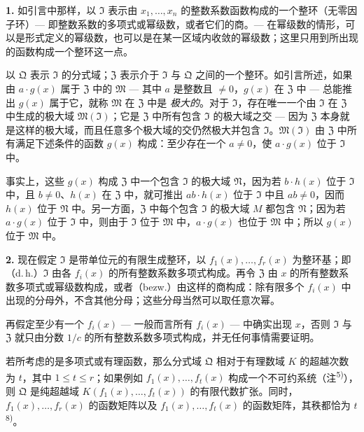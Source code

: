 \documentclass[11pt]{article}
\begin{document}
\noindent\textbf{1.}
如引言中那样，以 $\mathfrak{I}$ 表示由 $x_1,\ldots,x_n$ 的整数系数函数构成的一个整环（无零因子环）--- 即整数系数的多项式或幂级数，或者它们的商。--- 在幂级数的情形，可以是形式定义的幂级数，也可以是在某一区域内收敛的幂级数；这里只用到所出现的函数构成一个整环这一点。

以 $\mathfrak{Q}$ 表示 $\mathfrak{I}$ 的分式域；$\mathfrak{Z}$ 表示介于 $\mathfrak{I}$ 与 $\mathfrak{Q}$ 之间的一个整环。如引言所述，如果由 $a \cdot g(x)$ 属于 $\mathfrak{Z}$ 中的 $\mathfrak{M}$ --- 其中 $a$ 是整数且 $\neq 0$，$g(x)$ 在 $\mathfrak{Z}$ 中 --- 总能推出 $g(x)$ 属于它，就称 $\mathfrak{M}$ 在 $\mathfrak{Z}$ 中是 \textit{极大的}。对于 $\mathfrak{I}$，存在唯一一个由 $\mathfrak{I}$ 在 $\mathfrak{Z}$ 中生成的极大域 $\mathfrak{M}(\mathfrak{I})$；它是 $\mathfrak{Z}$ 中所有包含 $\mathfrak{I}$ 的极大域之交 --- 因为 $\mathfrak{Z}$ 本身就是这样的极大域，而且任意多个极大域的交仍然极大并包含 $\mathfrak{I}$。$\mathfrak{M}(\mathfrak{I})$ 由 $\mathfrak{Z}$ 中所有满足下述条件的函数 $g(x)$ 构成：至少存在一个 $a \neq 0$，使 $a \cdot g(x)$ 位于 $\mathfrak{I}$ 中。

事实上，这些 $g(x)$ 构成 $\mathfrak{Z}$ 中一个包含 $\mathfrak{I}$ 的极大域 $\mathfrak{N}$，因为若 $b \cdot h(x)$ 位于 $\mathfrak{I}$ 中，且 $b \neq 0$、$h(x)$ 在 $\mathfrak{Z}$ 中，就可推出 $ab \cdot h(x)$ 位于 $\mathfrak{I}$ 中且 $ab \neq 0$，因而 $h(x)$ 位于 $\mathfrak{N}$ 中。另一方面，$\mathfrak{Z}$ 中每个包含 $\mathfrak{I}$ 的极大域 $M$ 都包含 $\mathfrak{N}$；因为若 $a \cdot g(x)$ 位于 $\mathfrak{I}$ 中，则由于 $\mathfrak{I}$ 位于 $\mathfrak{M}$ 中，$a \cdot g(x)$ 也位于 $\mathfrak{M}$ 中；所以 $g(x)$ 位于 $\mathfrak{M}$ 中。

\medskip\noindent\textbf{2.}
现在假定 $\mathfrak{I}$ 是带单位元的有限生成整环，以 $f_1(x),\ldots,f_r(x)$ 为整环基；即（d.\,h.）$\mathfrak{I}$ 由各 $f_i(x)$ 的所有整数系数多项式构成。再令 $\mathfrak{Z}$ 由 $x$ 的所有整数系数多项式或幂级数构成，或者（bezw.）由这样的商构成：除有限多个 $f_i(x)$ 中出现的分母外，不含其他分母；这些分母当然可以取任意次幂。

再假定至少有一个 $f_i(x)$ --- 一般而言所有 $f_i(x)$ --- 中确实出现 $x$，否则 $\mathfrak{I}$ 与 $\mathfrak{Z}$ 就只由分数 $1/c$ 的所有整数系数多项式构成，并无任何事情需要证明。

若所考虑的是多项式或有理函数，那么分式域 $\mathfrak{Q}$ 相对于有理数域 $K$ 的超越次数为 $t$，其中 $1 \leq t \leq r$；如果例如 $f_1(x),\ldots,f_t(x)$ 构成一个不可约系统（注\textsuperscript{5)}），则 $\mathfrak{Q}$ 是纯超越域 $K(f_1(x),\ldots,f_t(x))$ 的有限代数扩张。同时，$f_1(x),\ldots,f_r(x)$ 的函数矩阵以及 $f_1(x),\ldots,f_t(x)$ 的函数矩阵，其秩都恰为 $t$\textsuperscript{8)}。
\end{document}
